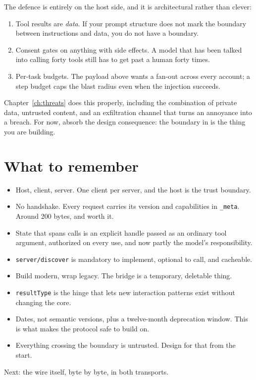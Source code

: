 The defence is entirely on the host side, and it is architectural rather than
clever:

\begin{enumerate}[leftmargin=1.6em, itemsep=3pt]
\item Tool results are \emph{data}. If your prompt structure does not mark the
boundary between instructions and data, you do not have a boundary.
\item Consent gates on anything with side effects. A model that has been talked
into calling forty tools still has to get past a human forty times.
\item Per-task budgets. The payload above wants a fan-out across every account;
a step budget caps the blast radius even when the injection succeeds.
\end{enumerate}

Chapter~\ref{ch:threats} does this properly, including the combination of
private data, untrusted content, and an exfiltration channel that turns an
annoyance into a breach. For now, absorb the design consequence: the boundary in  is the thing you are building.

\section{What to remember}

\begin{itemize}[leftmargin=1.6em, itemsep=3pt]
\item Host, client, server. One client per server, and the host is the trust
boundary.
\item No handshake. Every request carries its version and capabilities in
\texttt{\_meta}. Around 200 bytes, and worth it.
\item State that spans calls is an explicit handle passed as an ordinary tool
argument, authorized on every use, and now partly the model's responsibility.
\item \texttt{server/discover} is mandatory to implement, optional to call, and
cacheable.
\item Build modern, wrap legacy. The bridge is a temporary, deletable thing.
\item \texttt{resultType} is the hinge that lets new interaction patterns exist
without changing the core.
\item Dates, not semantic versions, plus a twelve-month deprecation window. This
is what makes the protocol safe to build on.
\item Everything crossing the boundary is untrusted. Design for that from the start.
\end{itemize}

Next: the wire itself, byte by byte, in both transports.
